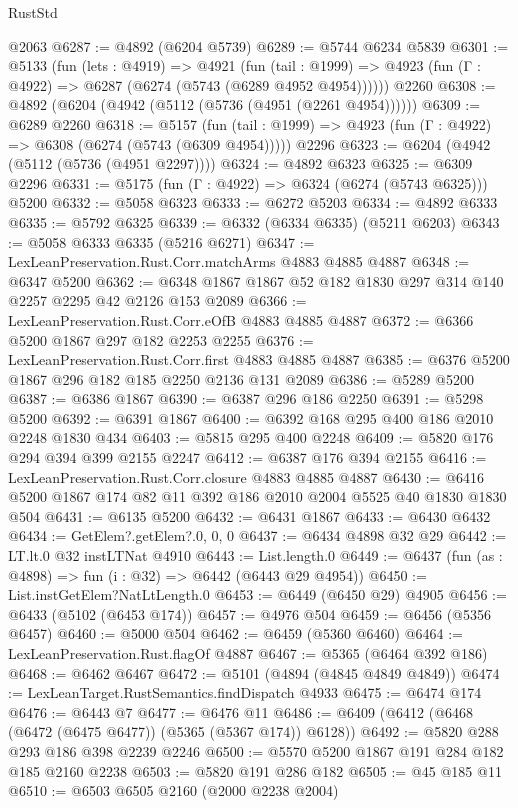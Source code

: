 \begin{lexlean}{RustStd}
\begin{coremodule}
    @2063
@6287 := @4892 (@6204 @5739)
@6289 := @5744 @6234 @5839
@6301 := @5133
    (fun (lets : @4919) =>
    @4921
      (fun (tail : @1999) => @4923 (fun (Γ : @4922) => @6287 (@6274 (@5743 (@6289 @4952 @4954))))))
    @2260
@6308 := @4892 (@6204 (@4942 (@5112 (@5736 (@4951 (@2261 @4954))))))
@6309 := @6289 @2260
@6318 := @5157
    (fun (tail : @1999) => @4923 (fun (Γ : @4922) => @6308 (@6274 (@5743 (@6309 @4954)))))
    @2296
@6323 := @6204 (@4942 (@5112 (@5736 (@4951 @2297))))
@6324 := @4892 @6323
@6325 := @6309 @2296
@6331 := @5175 (fun (Γ : @4922) => @6324 (@6274 (@5743 @6325))) @5200
@6332 := @5058 @6323
@6333 := @6272 @5203
@6334 := @4892 @6333
@6335 := @5792 @6325
@6339 := @6332 (@6334 @6335) (@5211 @6203)
@6343 := @5058 @6333 @6335 (@5216 @6271)
@6347 := LexLeanPreservation.Rust.Corr.matchArms @4883 @4885 @4887
@6348 := @6347 @5200
@6362 := @6348 @1867 @1867 @52 @182 @1830 @297 @314 @140 @2257 @2295 @42 @2126 @153 @2089
@6366 := LexLeanPreservation.Rust.Corr.eOfB @4883 @4885 @4887
@6372 := @6366 @5200 @1867 @297 @182 @2253 @2255
@6376 := LexLeanPreservation.Rust.Corr.first @4883 @4885 @4887
@6385 := @6376 @5200 @1867 @296 @182 @185 @2250 @2136 @131 @2089
@6386 := @5289 @5200
@6387 := @6386 @1867
@6390 := @6387 @296 @186 @2250
@6391 := @5298 @5200
@6392 := @6391 @1867
@6400 := @6392 @168 @295 @400 @186 @2010 @2248 @1830 @434
@6403 := @5815 @295 @400 @2248
@6409 := @5820 @176 @294 @394 @399 @2155 @2247
@6412 := @6387 @176 @394 @2155
@6416 := LexLeanPreservation.Rust.Corr.closure @4883 @4885 @4887
@6430 := @6416 @5200 @1867 @174 @82 @11 @392 @186 @2010 @2004 @5525 @40 @1830 @1830 @504
@6431 := @6135 @5200
@6432 := @6431 @1867
@6433 := @6430 @6432
@6434 := GetElem?.getElem?.{0, 0, 0}
@6437 := @6434 @4898 @32 @29
@6442 := LT.lt.{0} @32 instLTNat @4910
@6443 := List.length.{0}
@6449 := @6437 (fun (as : @4898) => fun (i : @32) => @6442 (@6443 @29 @4954))
@6450 := List.instGetElem?NatLtLength.{0}
@6453 := @6449 (@6450 @29) @4905
@6456 := @6433 (@5102 (@6453 @174))
@6457 := @4976 @504
@6459 := @6456 (@5356 @6457)
@6460 := @5000 @504
@6462 := @6459 (@5360 @6460)
@6464 := LexLeanPreservation.Rust.flagOf @4887
@6467 := @5365 (@6464 @392 @186)
@6468 := @6462 @6467
@6472 := @5101 (@4894 (@4845 @4849 @4849))
@6474 := LexLeanTarget.RustSemantics.findDispatch @4933
@6475 := @6474 @174
@6476 := @6443 @7
@6477 := @6476 @11
@6486 := @6409 (@6412 (@6468 (@6472 (@6475 @6477)) (@5365 (@5367 @174)) @6128))
@6492 := @5820 @288 @293 @186 @398 @2239 @2246
@6500 := @5570 @5200 @1867 @191 @284 @182 @185 @2160 @2238
@6503 := @5820 @191 @286 @182
@6505 := @45 @185 @11
@6510 := @6503 @6505 @2160 (@2000 @2238 @2004)

\end{coremodule}
\end{lexlean}
